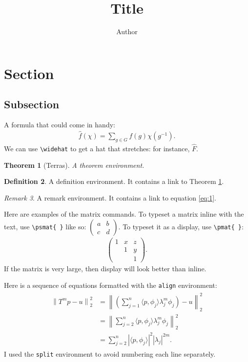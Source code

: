\documentclass[a4paper,10pt,leqno]{amsart}
\numberwithin{equation}{section}
\theoremstyle{plain}
\newtheorem{thm}{Theorem}[section]
\theoremstyle{plain}
\theoremstyle{definition}
\newtheorem{df}[thm]{Definition}
\theoremstyle{remark}
\newtheorem{rem}[thm]{Remark}
\newcommand{\pa}[1]{\left(#1\right)}
\newcommand{\mat}[1]{\begin{matrix}#1\end{matrix}}
\newcommand{\pmat}[1]{\pa{\mat{#1}}}
\newcommand{\smat}[1]{\begin{smallmatrix}#1\end{smallmatrix}}
\newcommand{\psmat}[1]{\pa{\smat{#1}}}
\begin{document}
\title{Title}
\author{Author}
\maketitle

\thispagestyle{empty}



\section{Section}

\subsection{Subsection}

A formula that could come in handy:
\begin{align}\label{eq:1}
\hat{f}(\chi) = \sum_{g \in G} f(g)\chi(g^{-1}).
\end{align}
We can use \texttt{\textbackslash{}widehat} to get a hat that stretches: for instance, $\widehat{F}$.

\begin{thm}[Terras]\label{thm:1}
A theorem environment.
\end{thm}

\begin{df}
A definition environment.
It contains a link to Theorem \ref{thm:1}.
\end{df}

\begin{rem}
A remark environment.
It contains a link to equation \eqref{eq:1}.
\end{rem}

Here are examples of the matrix commands.
To typeset a matrix inline with the text, use \texttt{\textbackslash{}psmat\{ \}} like so: $\psmat{a&b\\c&d}$.
To typeset it as a display, use \texttt{\textbackslash{}pmat\{ \}}:
\begin{align}
\pmat{1&x&z\\ &1&y \\ &&1}.
\end{align}
If the matrix is very large, then display will look better than inline.

Here is a sequence of equations formatted with the \texttt{align} environment:
\begin{align}
\begin{split}
\left\| T^m p - u \right\|_2^2
&=	\left\|\pa{\sum_{j = 1}^n \langle p, \phi_j\rangle \lambda_j^m \phi_j} - u\right\|_2^2\\
&=	\left\|\sum_{j = 2}^n \langle p, \phi_j\rangle \lambda_j^m \phi_j\right\|_2^2\\
&=	\sum_{j = 2}^n |\langle p, \phi_j\rangle|^2 |\lambda_j|^{2m}.
\end{split}\end{align}
I used the \texttt{split} environment to avoid numbering each line separately.
\end{document}
